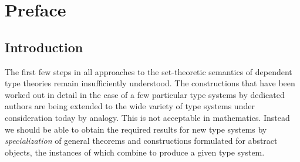 \documentclass[onecolumn,12pt]{amsart}
\numberwithin{proposition}{subsection}
\begin{document}



\maketitle

\tableofcontents


\section{Preface}

\subsection{Introduction}

The first few steps in all approaches to the set-theoretic semantics of
dependent type theories remain insufficiently understood. The constructions
that have been worked out in detail in the case of a few particular type
systems by dedicated authors are being extended to the wide variety of type
systems under consideration today by analogy. This is not acceptable in
mathematics. Instead we should be able to obtain the required results for new
type systems by {\em specialization} of general theorems and constructions
formulated for abstract objects, the instances of which combine to
produce a given type system.





\end{document}
